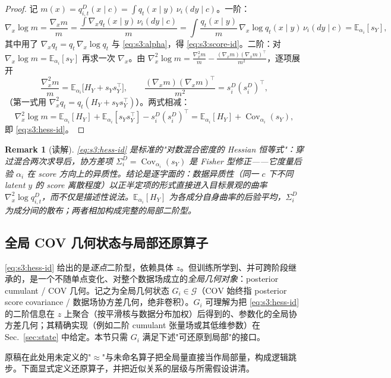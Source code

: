 \documentclass[11pt,a4paper]{article}
\newtheorem{remark}[theorem]{Remark}
\DeclareMathOperator{\Cov}{Cov}
\newcommand{\E}{\mathbb{E}}
\newcommand{\cG}{\mathcal{G}}   %
\newcommand{\COV}{\mathrm{COV}}     %
\begin{document}
\begin{proof}
记 $m(x)=q_{i,t}^{D}(x\mid c)=\int q_t(x\mid y)\,\nu_i(dy\mid c)$。一阶：
\[
\nabla_x\log m=\frac{\nabla_x m}{m}
=\frac{\int \nabla_x q_t(x\mid y)\,\nu_i(dy\mid c)}{m}
=\int \frac{q_t(x\mid y)}{m}\,\nabla_x\log q_t(x\mid y)\,\nu_i(dy\mid c)
=\E_{\alpha_i}[s_Y],
\]
其中用了 $\nabla_x q_t=q_t\,\nabla_x\log q_t$ 与 \eqref{eq:s3:alpha}，得 \eqref{eq:s3:score-id}。二阶：对 $\nabla_x\log m=\E_{\alpha_i}[s_Y]$ 再求一次 $\nabla_x$。由 $\nabla_x^2\log m=\frac{\nabla_x^2 m}{m}-\frac{(\nabla_x m)(\nabla_x m)^\top}{m^2}$，逐项展开
\[
\frac{\nabla_x^2 m}{m}=\E_{\alpha_i}\!\big[H_Y+s_Y s_Y^\top\big],\qquad
\frac{(\nabla_x m)(\nabla_x m)^\top}{m^2}=s_i^{D}(s_i^{D})^\top,
\]
（第一式用 $\nabla_x^2 q_t=q_t(H_Y+s_Ys_Y^\top)$）。两式相减：
\[
\nabla_x^2\log m=\E_{\alpha_i}[H_Y]+\E_{\alpha_i}[s_Ys_Y^\top]-s_i^{D}(s_i^{D})^\top
=\E_{\alpha_i}[H_Y]+\Cov_{\alpha_i}(s_Y),
\]
即 \eqref{eq:s3:hess-id}。
\end{proof}

\begin{remark}[读解]\label{rem:s3:read}
\eqref{eq:s3:hess-id} 是标准的"对数混合密度的 Hessian 恒等式"：穿过混合两次求导后，协方差项 $\Sigma_i^{D}=\Cov_{\alpha_i}(s_Y)$ 是 Fisher 型修正——它度量后验 $\alpha_i$ 在 score 方向上的异质性。结论是\emph{逐字面的}：数据异质性（同一 $c$ 下不同 latent $y$ 的 score 离散程度）以正半定项的形式直接进入目标景观的曲率 $\nabla_x^2\log q_{i,t}^{D}$，而不仅是描述性说法。$\E_{\alpha_i}[H_Y]$ 为各成分自身曲率的后验平均，$\Sigma_i^{D}$ 为成分间的散布；两者相加构成完整的局部二阶型。
\end{remark}

\subsection{全局 COV 几何状态与局部还原算子}\label{subsec:s3:global-local}

\eqref{eq:s3:hess-id} 给出的是\emph{逐点}二阶型，依赖具体 $z$。但训练所学到、并可跨阶段继承的，是一个不随单点变化、对整个数据场成立的\emph{全局几何对象}：posterior cumulant / COV 几何。记之为全局几何状态 $G_i\in\cG$（$\COV$ 始终指 posterior score covariance / 数据场协方差几何，绝非卷积）。$G_i$ 可理解为把 \eqref{eq:s3:hess-id} 的二阶信息在 $z$ 上聚合（按平滑核与数据分布加权）后得到的、参数化的全局协方差几何；其精确实现（例如二阶 cumulant 张量场或其低维参数）在 Sec.~\ref{sec:state} 中给定。本节只需 $G_i$ 满足下述"可还原到局部"的接口。

原稿在此处用未定义的"$\approx$"与未命名算子把全局量直接当作局部量，构成逻辑跳步。下面显式定义还原算子，并把近似关系的层级与所需假设讲清。
\end{document}
